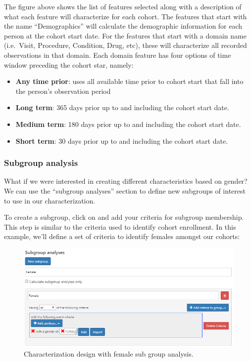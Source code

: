\documentclass[11pt]{book}
\providecommand{\tightlist}{%
  \setlength{\itemsep}{0pt}\setlength{\parskip}{0pt}}
\theoremstyle{definition}
\theoremstyle{definition}
\theoremstyle{definition}
\theoremstyle{remark}
\begin{document}
The figure above shows the list of features selected along with a description of what each feature will characterize for each cohort. The features that start with the name ``Demographics'' will calculate the demographic information for each person at the cohort start date. For the features that start with a domain name (i.e.~Visit, Procedure, Condition, Drug, etc), these will characterize all recorded observations in that domain. Each domain feature has four options of time window preceding the cohort star, namely:

\begin{itemize}
\tightlist
\item
  \textbf{Any time prior}: uses all available time prior to cohort start that fall into the person's observation period
\item
  \textbf{Long term}: 365 days prior up to and including the cohort start date.
\item
  \textbf{Medium term}: 180 days prior up to and including the cohort start date.
\item
  \textbf{Short term}: 30 days prior up to and including the cohort start date.
\end{itemize}

\hypertarget{subgroup-analysis}{%
\subsubsection{Subgroup analysis}\label{subgroup-analysis}}

What if we were interested in creating different characteristics based on gender? We can use the ``subgroup analyses'' section to define new subgroups of interest to use in our characterization.

To create a subgroup, click on and add your criteria for subgroup membership. This step is similar to the criteria used to identify cohort enrollment. In this example, we'll define a set of criteria to identify females amongst our cohorts:

\begin{figure}

{\centering \includegraphics[width=1\linewidth]{images/Characterization/atlasCharacterizationSubgroup} 

}

\caption{Characterization design with female sub group analysis.}\label{fig:atlasCharacterizationSubgroup}
\end{figure}
\end{document}
